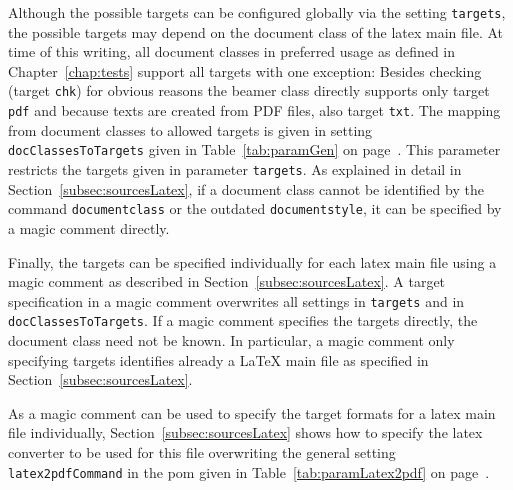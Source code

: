 Although the possible targets can be configured globally 
via the setting \texttt{targets}, 
the possible targets may depend on the document class of the latex main file. 
At time of this writing, 
all document classes in preferred usage as defined in Chapter~\ref{chap:tests} 
support all targets with one exception: 
Besides checking (target \texttt{chk}) for obvious reasons 
the beamer class directly supports only target \texttt{pdf} 
and because texts are created from PDF files, also target \texttt{txt}. 
The mapping from document classes to allowed targets 
is given in setting \texttt{docClassesToTargets} given in 
Table~\ref{tab:paramGen} on page~\pageref{tab:paramGen}. 
This parameter restricts the targets given in parameter \texttt{targets}. 
As explained in detail in  Section~\ref{subsec:sourcesLatex}, 
if a document class cannot be identified by the command \texttt{documentclass} 
or the outdated \texttt{documentstyle}, 
it can be specified by a magic comment directly. 

Finally, the targets can be specified individually for each latex main file 
using a magic comment as described in Section~\ref{subsec:sourcesLatex}. 
A target specification in a magic comment overwrites all settings in 
\texttt{targets} and in \texttt{docClassesToTargets}. 
If a magic comment specifies the targets directly, 
the document class need not be known. 
In particular, a magic comment only specifying targets identifies already a \LaTeX{} main file 
as specified in Section~\ref{subsec:sourcesLatex}. 

As a magic comment can be used 
to specify the target formats for a latex main file individually, 
Section~\ref{subsec:sourcesLatex} shows 
how to specify the latex converter to be used for this file 
overwriting the general setting \texttt{latex2pdfCommand} in the pom 
given in Table~\ref{tab:paramLatex2pdf} on page~\pageref{subsec:sourcesLatex}. 




